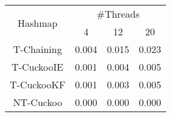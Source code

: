 \begin{tabular}{|c|c|c|c|}
\hline
\multirow{2}{*}{Hashmap} & \multicolumn{3}{c|}{\#Threads}\\\cline{2-4}& 4 & 12 & 20\\
\hline
\hline
T-Chaining & 0.004 & 0.015 & 0.023\\
T-CuckooIE & 0.001 & 0.004 & 0.005\\
T-CuckooKF & 0.001 & 0.003 & 0.005\\
NT-Cuckoo & 0.000 & 0.000 & 0.000\\
\hline
\end{tabular}

